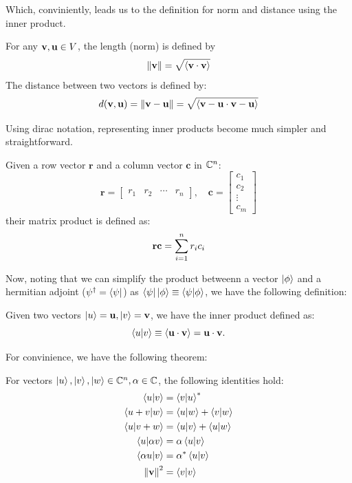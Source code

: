 \documentclass[12pt]{article}
\begin{document}
Which, conviniently, leads us to the definition for norm and distance using the inner product.

\begin{definition}
    For any $\mathbf{v}, \mathbf{u} \in V$, the length (norm) is defined by 
    $$\norm{\mathbf{v}} = \sqrt{\left\langle\mathbf{v} \cdot \mathbf{v} \right\rangle}$$
    The distance between two vectors is defined by:
    $$d(\mathbf{v}, \mathbf{u}) = \norm{\mathbf{v} - \mathbf{u}} = \sqrt{\left\langle\mathbf{v} - \mathbf{u} \cdot \mathbf{v} - \mathbf{u} \right\rangle}$$
\end{definition}

Using dirac notation, representing inner products become much simpler and straightforward.

\begin{definition}
    Given a row vector $\mathbf{r}$ and a column vector $\mathbf{c}$ in $\mathbb{C}^n$:
    $$\mathbf{r} = 
    \begin{bmatrix}
    r_1 &
    r_2 &
    \cdots &
    r_n
    \end{bmatrix}, \quad \mathbf{c} = 
    \begin{bmatrix}
    c_1 \\ c_2 \\ \vdots \\ c_m
    \end{bmatrix}
    $$
    their matrix product is defined as:
    $$\mathbf{rc} = \sum_{i=1}^{n} r_i c_i$$
\end{definition}

Now, noting that we can simplify the product betweenn a vector $\ket{\phi}$ and a hermitian adjoint ($\psi^\dagger = \bra{\psi}$) as $\brapsi \ketphi \equiv \braket{\psi}{\phi}$, we have the following definition:

\begin{definition}
    Given two vectors $\ket{u} = \mathbf{u}, \ket{v} = \mathbf{v}$, we have the inner product defined as:
    $$\braket{u}{v} \equiv \left\langle\mathbf{u} \cdot \mathbf{v} \right\rangle = \mathbf{u} \cdot \mathbf{v}.$$
\end{definition}

For convinience, we have the following theorem:

\begin{theorem}
    For vectors $\ket{u}, \ket{v}, \ket{w} \in \mathbb{C}^n, \alpha \in \mathbb{C}$, the following identities hold:
    \begin{align*}
        \braket{u}{v} &= {\braket{v}{u}}^* \\
        \braket{u + v}{w} &= \braket{u}{w} + \braket{v}{w} \\
        \braket{u}{v + w} &= \braket{u}{v} + \braket{u}{w} \\ 
        \braket{u}{\alpha v} &= \alpha \braket{u}{v} \\
        \braket{\alpha u}{v} &= {\alpha}^* \braket{u}{v} \\
        \norm{\mathbf{v}}^2 &= \braket{v}{v} \\
    \end{align*}
\end{theorem}
\end{document}
